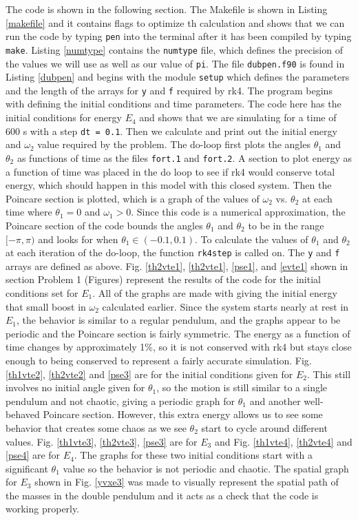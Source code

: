 \documentclass[12pt]{article}
\begin{document}
The code is shown in the following section.  The Makefile is shown in Listing \ref{makefile} and it contains flags to optimize th calculation and shows that we can run the code by typing {\tt pen} into the terminal after it has been compiled by typing {\tt make}.  Listing \ref{numtype} contains the {\tt numtype} file, which defines the precision of the values we will use as well as our value of {\tt pi}.  The file {\tt dubpen.f90} is found in Listing \ref{dubpen} and begins with the module {\tt setup} which defines the parameters and the length of the arrays for {\tt y} and {\tt f} required by rk4.  The program begins with defining the initial conditions and time parameters.  The code here has the initial conditions for energy $E_4$ and shows that we are simulating for a time of 600 s with a step {\tt dt = 0.1}.  Then we calculate and print out the initial energy and $\omega_2$ value required by the problem.  The do-loop first plots the angles $\theta_1$ and $\theta_2$ as functions of time as the files {\tt fort.1} and {\tt fort.2}.  A section to plot energy as a function of time was placed in the do loop to see if rk4 would conserve total energy, which should happen in this model with this closed system.  Then the Poincare section is plotted, which is a graph of the values of $\omega_2$ vs. $\theta_2$ at each time where $\theta_1=0$ and $\omega_1>0$.  Since this code is a numerical approximation, the Poincare section of the code bounds the angles $\theta_1$ and $\theta_2$ to be in the range $[-\pi,\pi)$ and looks for when $\theta_1 \in (-0.1,0.1)$.  To calculate the values of $\theta_1$ and $\theta_2$ at each iteration of the do-loop, the function {\tt rk4step} is called on.  The {\tt y} and {\tt f} arrays are defined as above.  Fig. \ref{th2vte1}, \ref{th2vte1}, \ref{pse1}, and \ref{evte1} shown in section Problem 1 (Figures) represent the results of the code for the initial conditions set for $E_1$.  All of the graphs are made with giving the initial energy that small boost in $\omega_2$ calculated earlier.  Since the system starts nearly at rest in $E_1$, the behavior is similar to a regular pendulum, and the graphs appear to be periodic and the Poincare section is fairly symmetric.  The energy as a function of time changes by approximately 1\%, so it is not conserved with rk4 but stays close enough to being conserved to represent a fairly accurate simulation.  Fig. \ref{th1vte2}, \ref{th2vte2} and \ref{pse3} are for the initial conditions given for $E_2$.  This still involves no initial angle given for $\theta_1$, so the motion is still similar to a single pendulum and not chaotic, giving a periodic graph for $\theta_1$ and another well-behaved Poincare section.  However, this extra energy allows us to see some behavior that creates some chaos as we see $\theta_2$ start to cycle around different values.  Fig. \ref{th1vte3}, \ref{th2vte3}, \ref{pse3} are for $E_3$ and Fig. \ref{th1vte4}, \ref{th2vte4} and \ref{pse4} are for $E_4$.  The graphs for these two initial conditions start with a significant $\theta_1$ value so the behavior is not periodic and chaotic.  The spatial graph for $E_3$ shown in Fig. \ref{yvxe3} was made to visually represent the spatial path of the masses in the double pendulum and it acts as a check that the code is working properly.
\end{document}
